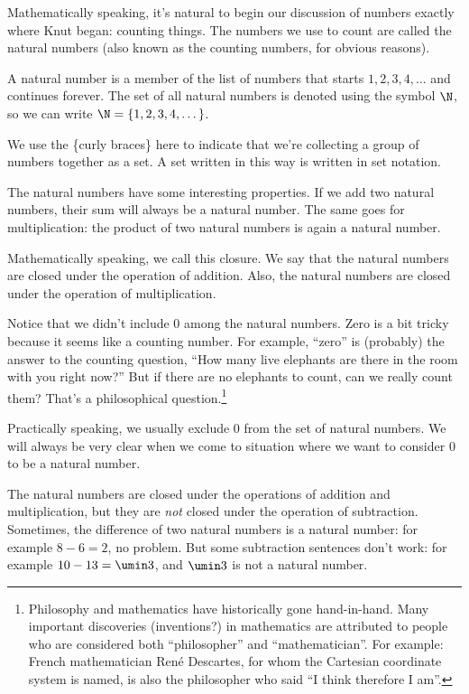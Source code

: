 Mathematically speaking, it's natural to begin our discussion of numbers exactly where Knut began: counting things. The numbers we use to count are called the natural numbers (also known as the counting numbers, for obvious reasons).

\begin{boxeddef}
A \gls{natural number} is a member of the list of numbers that starts $1, 2, 3, 4,\dotsc$ and continues forever. The set of all natural numbers is denoted using the symbol $\N$, so we can write $\N = \{1, 2, 3, 4, \dotsc\}$.

We use the \{curly braces\} here to indicate that we're collecting a group of numbers together as a \gls{set}. A set written in this way is written in \gls{set notation}.
\end{boxeddef}

The natural numbers have some interesting properties. If we add two natural numbers, their sum will always be a natural number. The same goes for multiplication: the product of two natural numbers is again a natural number.

Mathematically speaking, we call this \gls{closure}. We say that the natural numbers are closed under the operation of addition. Also, the natural numbers are closed under the operation of multiplication.

Notice that we didn't include 0 among the natural numbers. Zero is a bit tricky because it seems like a counting number. For example, ``zero'' is (probably) the answer to the counting question, ``How many live elephants are there in the room with you right now?'' But if there are no elephants to count, can we really count them? That's a philosophical question.\footnote{Philosophy and mathematics have historically gone hand-in-hand. Many important discoveries (inventions?) in mathematics are attributed to people who are considered both ``philosopher'' and ``mathematician''. For example: French mathematician Ren\'{e} Descartes, for whom the Cartesian coordinate system is named, is also the philosopher who said ``I think therefore I am''.}

Practically speaking, we usually exclude 0 from the set of natural numbers. We will always be very clear when we come to situation where we want to consider 0 to be a natural number.

The natural numbers are closed under the operations of addition and multiplication, but they are \textit{not} closed under the operation of subtraction. Sometimes, the difference of two natural numbers is a natural number: for example $8-6=2$, no problem. But some subtraction sentences don't work: for example $10-13 = \umin3$, and $\umin3$ is not a natural number.

